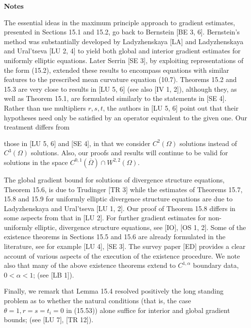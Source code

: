 \bigskip

\textbf{Notes}

The essential ideas in the maximum principle approach to gradient estimates, presented in Sections 15.1 and 15.2, go back to Bernstein [BE 3, 6]. Bernstein's method was substantially developed by Ladyzhenskaya [LA] and Ladyzhenskaya and Ural'tseva [LU 2, 4] to yield both global and interior gradient estimates for uniformly elliptic equations. Later Serrin [SE 3], by exploiting representations of the form (15.2), extended these results to encompass equations with similar features to the prescribed mean curvature equation (10.7). Theorems 15.2 and 15.3 are very close to results in [LU 5, 6] (see also [IV 1, 2]), although they, as well as Theorem 15.1, are formulated similarly to the statements in [SE 4]. Rather than use multipliers $r, s, t$, the authors in [LU 5, 6] point out that their hypotheses need only be satisfied by an operator equivalent to the given one. Our treatment differs from


those in [LU 5, 6] and [SE 4], in that we consider $C^2(\Omega)$ solutions instead of $C^3(\Omega)$
solutions. Also, our proofs and results will continue to be valid for solutions in the
space $C^{0,1}(\overline{\Omega}) \cap W^{2,2}(\Omega)$.

The global gradient bound for solutions of divergence structure equations,
Theorem 15.6, is due to Trudinger [TR 3] while the estimates of Theorems 15.7,
15.8 and 15.9 for uniformly elliptic divergence structure equations are due to
Ladyzhenskaya and Ural'tseva [LU 1, 2]. Our proof of Theorem 15.8 differs in
some aspects from that in [LU 2]. For further gradient estimates for non-
uniformly elliptic, divergence structure equations, see [IO], [OS 1, 2]. Some of the
existence theorems in Sections 15.5 and 15.6 are already formulated in the literature,
see for example [LU 4], [SE 3]. The survey paper [ED] provides a clear account
of various aspects of the execution of the existence procedure. We note also that
many of the above existence theorems extend to $C^{1,\alpha}$ boundary data, $0<\alpha<1$;
(see [LB 1]).

Finally, we remark that Lemma 15.4 resolved positively the long standing
problem as to whether the natural conditions (that is, the case $\theta = 1, r=s=t_i=0$
in (15.53)) alone suffice for interior and global gradient bounds; (see [LU 7],
[TR 12]).

\medskip

